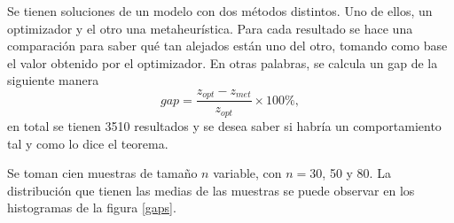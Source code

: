 \documentclass[12pt]{article}
\begin{document}
	Se tienen soluciones de un modelo con dos métodos distintos. Uno de ellos, un optimizador y el otro una metaheurística. Para cada resultado se hace una comparación para saber qué tan alejados están uno del otro, tomando como base el valor obtenido por el optimizador. En otras palabras, se calcula un gap de la siguiente manera
	\begin{equation*}
	gap = \frac{z_{opt} - z_{met}}{z_{opt}} \times 100 \%,
	\end{equation*}
	en total se tienen 3510 resultados y se desea saber si habría un comportamiento tal y como lo dice el teorema.
	
	Se toman cien muestras de tamaño $n$ variable, con $n=30$, 50 y 80. La distribución que tienen las medias de las muestras se puede observar en los histogramas de la figura \ref{gaps}.
	
\end{document}
